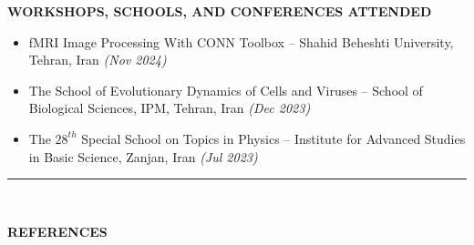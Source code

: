 \documentclass[12pt, b4paper]{cv}
\begin{document}
{\Large \textbf{WORKSHOPS, SCHOOLS, AND CONFERENCES ATTENDED}}
\vspace{-5pt}

\begin{itemize}[leftmargin=*]
    \item fMRI Image Processing With CONN Toolbox -- Shahid Beheshti University, Tehran, Iran \textit{(Nov 2024)}
    \item The School of Evolutionary Dynamics of Cells and Viruses -- School of Biological Sciences, IPM, Tehran, Iran \textit{(Dec 2023)}
    \item The $28^{th}$ Special School on Topics in Physics -- Institute for Advanced Studies in Basic Science, Zanjan, Iran \textit{(Jul 2023)}
\end{itemize}


\vspace{-0.15in}
\rule{\textwidth}{1pt}\\
\vspace{-0.15in}



{\Large \textbf{REFERENCES}}
\vspace{-5pt}
\end{document}
